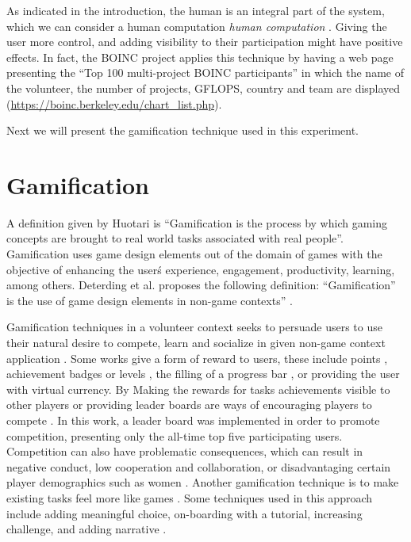 \documentclass{llncs}
\begin{document}
As indicated in the introduction, the human is an integral part of the system, which we can consider a human computation {\em human computation} \cite{quinn2011human}. Giving the user more control, and adding visibility to their participation might have positive effects. In fact, the BOINC project applies this technique by having a web page presenting the ``Top 100 multi-project BOINC participants'' in which the name of the volunteer, the number of projects, GFLOPS, country and team are displayed
(\url{https://boinc.berkeley.edu/chart_list.php}).

Next we will present the gamification technique used in this experiment.

\section{Gamification}
\label{sec:gamification}
A definition given by Huotari  \cite{huotari2012defining} is ``Gamification is
the process by which gaming concepts are brought to real world tasks associated with
real people''. Gamification uses game design elements out of the domain of games
with the objective of enhancing the user\'s experience, engagement, productivity,
learning, among others. Deterding et al. proposes the following definition:
 ``Gamification” is the use of game design elements in non-game contexts''
 \cite{deterding2011gamification}.

Gamification techniques in a volunteer context seeks to persuade
users to use their natural desire to compete, learn and socialize in
given non-game context application \cite{deterding2011game,hamari2014does}.
Some works give a form of reward to users, these include
points \cite{sutter2010browse}, achievement badges or levels \cite{hamari2011framework},
the filling of a progress bar \cite{o2010get}, or providing the user with virtual currency.
By Making the rewards for  tasks achievements visible to other players or
providing leader boards are ways of encouraging players to compete \cite{hickman2010total}. In this work, a leader board was implemented in order to promote competition, presenting only the all-time top five participating users. Competition can also have problematic consequences, which can result in
negative conduct, low cooperation and collaboration, or disadvantaging certain player demographics
such as women \cite{kumar2013gamification}. Another gamification technique
is to make existing tasks feel more like games \cite{deterding2010just}.
Some techniques used in this approach include adding meaningful choice,
on-boarding with a tutorial, increasing challenge, and adding narrative \cite{mcgonigal2011reality}.
\end{document}
